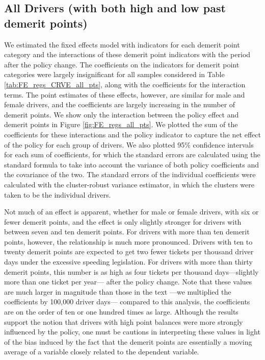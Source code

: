 \subsection*{All Drivers (with both high and low past demerit points)}


We estimated the fixed effects model with indicators for each demerit point category
and the interactions of these demerit point indicators with the period after the policy change. 
% 
The coefficients on the indicators for demerit point categories were largely insignificant for 
all samples considered in Table \ref{tab:FE_regs_CRVE_all_pts}, 
along with the coefficients for the interaction terms. 
% 
The point estimates of these effects, however, are similar for male and female drivers, 
and the coefficients are largely increasing in the number of demerit points. 
% 
% 
We show only the interaction between the policy effect and demerit points
in Figure \ref{fig:FE_regs_all_pts}. 
% 
% 
We plotted the sum of the coefficients for these interactions and the policy indicator
to capture the net effect of the policy for each group of drivers.
% 
We also plotted 95\% confidence intervals for each sum of coefficients, 
for which the standard errors are calculated using the standard formula to take into account the variance of both policy coefficients and the covariance of the two.  
The standard errors of the individual coefficients were calculated with the cluster-robust variance estimator, 
in which the clusters were taken to be the individual drivers. 

Not much of an effect is apparent, whether for male or female drivers, with six or fewer demerit points, 
and the effect is only slightly stronger for drivers with between seven and ten demerit points. 
For drivers with more than ten demerit points, however, the relationship is much more pronounced. 
Drivers with ten to twenty demerit points are expected to get two fewer tickets per thousand driver days
under the excessive speeding legislation. 
For drivers with more than thirty demerit points, 
this number is as high as four tickets per thousand days---slightly more than one ticket per year---%
after the policy change. 
% 
Note that these values are much larger in magnitude than those in the text%
---we multiplied the coefficients by 100,000 driver days---%
compared to this analysis, the coefficients are on the order of ten or one hundred times as large. 
Although the results support the notion that drivers with high point balances were more strongly influenced by the policy, 
one must be cautions in interpreting these values in light of the bias induced
by the fact that the demerit points are essentially a moving average of a 
variable closely related to the dependent variable. 



